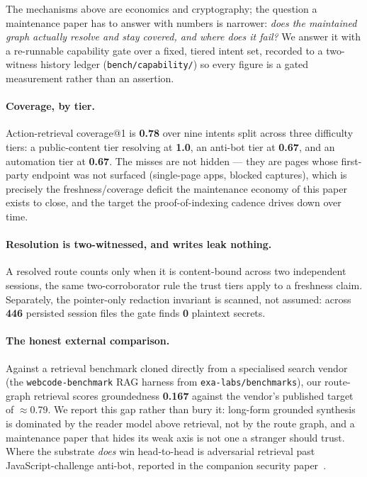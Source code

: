 \documentclass[11pt]{article}
\begin{document}
The mechanisms above are economics and cryptography; the question a maintenance
paper has to answer with numbers is narrower: \emph{does the maintained graph
actually resolve and stay covered, and where does it fail?} We answer it with a
re-runnable capability gate over a fixed, tiered intent set, recorded to a
two-witness history ledger (\texttt{bench/capability/}) so every figure is a gated
measurement rather than an assertion.

\paragraph{Coverage, by tier.} Action-retrieval coverage@1 is \textbf{0.78} over nine
intents split across three difficulty tiers: a public-content tier resolving at
\textbf{1.0}, an anti-bot tier at \textbf{0.67}, and an automation tier at
\textbf{0.67}. The misses are not hidden --- they are pages whose first-party
endpoint was not surfaced (single-page apps, blocked captures), which is precisely
the freshness/coverage deficit the maintenance economy of this paper exists to
close, and the target the proof-of-indexing cadence drives down over time.

\paragraph{Resolution is two-witnessed, and writes leak nothing.} A resolved route
counts only when it is content-bound across two independent sessions, the same
two-corroborator rule the trust tiers apply to a freshness claim. Separately, the
pointer-only redaction invariant is scanned, not assumed: across \textbf{446}
persisted session files the gate finds \textbf{0} plaintext secrets.

\paragraph{The honest external comparison.} Against a retrieval benchmark cloned
directly from a specialised search vendor (the \texttt{webcode-benchmark} RAG
harness from \texttt{exa-labs/benchmarks}), our route-graph retrieval scores
groundedness \textbf{0.167} against the vendor's published target of $\approx$0.79.
We report this gap rather than bury it: long-form grounded synthesis is dominated by
the reader model above retrieval, not by the route graph, and a maintenance paper
that hides its weak axis is not one a stranger should trust. Where the substrate
\emph{does} win head-to-head is adversarial retrieval past JavaScript-challenge
anti-bot, reported in the companion security paper~\cite{security}.
\end{document}
